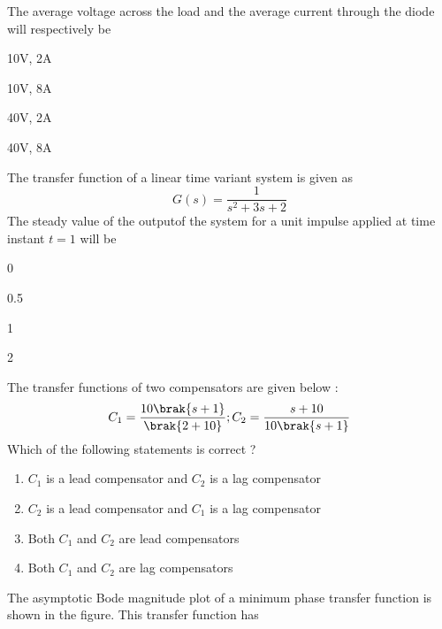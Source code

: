 		The average voltage across the load and the average current through the diode will respectively be
		\begin{enumerate}
		\end{enumerate}
	\item The transfer function of a linear time variant system is given as 
		$$ G(s) = \frac{1}{s^2 + 3s + 2} $$
		The steady value of the outputof the system for a unit impulse applied at time instant $t=1$ will be
		\begin{enumerate}
				\begin{multicols}{4}
				\item 0
				\item 0.5
				\item 1
				\item 2
				\end{multicols}
		\end{enumerate}
	\item The transfer functions of two compensators are given below :
		$$ C_1 = \frac{10\brak{s+1}}{\brak{2+10}} ; C_2 = \frac{s+10}{10\brak{s+1}} $$
		Which of the following statements is correct ?
		\begin{enumerate}
			\item $C_1$ is a lead compensator and $C_2$ is a lag compensator
			\item $C_2$ is a lead compensator and $C_1$ is a lag compensator
			\item Both $C_1$ and $C_2$ are lead compensators
			\item Both $C_1$ and $C_2$ are lag compensators
		\end{enumerate}
	\item The asymptotic Bode magnitude plot of a minimum phase transfer function is shown in the figure. This transfer function has
